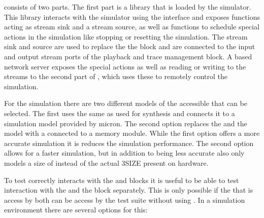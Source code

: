 \flange{} consists of two parts. The first part is a library that is loaded by the simulator. This library interacts with the simulator using the \DPI{} interface and exposes functions acting as stream sink and a stream source, as well as functions to schedule special actions in the simulation like stopping or resetting the simulation. The stream sink and source are used to replace the the \HostARQ{} block and are connected to the input and output stream ports of the playback and trace management block. A \RCF{} based network server exposes the special actions as well as reading or writing to the streams to the second part of \flange{}, which uses these to remotely control the simulation.

For the simulation there are two different models of the \AXI{} accessible \DRAM{} that can be selected. The first uses the same \MIG{} as used for synthesis and connects it to a \DDR{} simulation model provided by micron. The second option replaces the \MIG{} and the \DDR{} model with a \AXIBRAMController{} connected to a memory module. While the first option offers a more accurate simulation it is reduces the simulation performance. The second option allows for a faster simulation, but in addition to being less accurate also only models a size of \SIMMEMSIZE{} instead of the actual \DDR3SIZE{} present on hardware.

To test \ayo{} correctly interacts with the \FAXI{} and \AXIDMA{} blocks it is useful to be able to test interaction with the \FAXI{} and the \AXIDMA{} block separately. This is only possible if the \DRAM{} that is access by both can be access by the test suite without using \FAXI{}. In a simulation environment there are several options for this:


